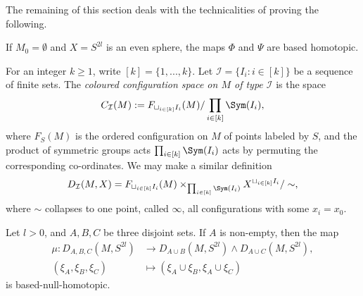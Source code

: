 The remaining of this section deals with the technicalities of proving the following.
\begin{proposition}\label{prop:phiandpsihomotopic}
    If $M_0=\emptyset$ and $X=S^{2l}$ is an even sphere, the maps $\Phi$ and $\Psi$ are based homotopic.
\end{proposition}

For an integer $k\ge 1$, write $[k]=\{1,...,k\}$. Let  $\mathcal{I}=\{I_i: i\in [k]\}$ be a sequence of finite sets. The \textit{coloured configuration space on $M$ of type $\mathcal{I}$} is the space $$C_{\mathcal{I}}(M):=F_{\sqcup_{i\in [k]}I_i}(M)/\prod_{i\in [k]}\Sym(I_i),$$
where $F_S(M)$ is the ordered configuration on $M$ of points labeled by $S$, and the product of symmetric groups acts $\prod_{i\in [k]}\Sym(I_i)$ acts by permuting the corresponding co-ordinates. We may make a similar definition $$D_{\mathcal{I}}(M,X)=F_{\sqcup_{i\in [k]}I_i}(M)\times_{\prod_{i\in [k]}\Sym(I_i)} X^{\sqcup_{i\in [k]}I_i}/\sim,$$ where $\sim$ collapses to one point, called $\infty$, all configurations with some $x_i=x_0$.  
\begin{lemma}\label{lem:configurationmapnullhomotopic}
    Let $l>0$, and $A,B,C$ be three disjoint sets. If $A$ is non-empty, then the map 
    \begin{align*}
        \mu:D_{A, B, C}(M,S^{2l})&\longrightarrow D_{A\cup B}(M,S^{2l})\wedge D_{A\cup C}(M,S^{2l}),\\
        (\xi_A,\xi_B, \xi_C)&\longmapsto (\xi_A\cup \xi_B, \xi_A\cup \xi_C)
    \end{align*} is based-null-homotopic.
\end{lemma}
